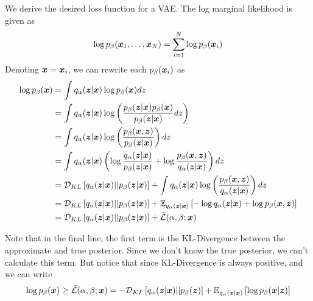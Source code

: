 We derive the desired loss function for a VAE. The log marginal likelihood is given as
\begin{equation}
  \log p_{\beta}(\boldsymbol{x}_1,\ldots,\boldsymbol{x}_N) = \sum_{i=1}^N \log p_{\beta}(\boldsymbol{x}_i)
  \label{eq:vae_marginal}
\end{equation}
Denoting $\boldsymbol{x} = \boldsymbol{x}_i$, we can rewrite each $p_{\beta}(\boldsymbol{x}_i)$ as 
\begin{equation}
  \begin{split}
    \log p_{\beta}(\boldsymbol{x}) &= \int q_\alpha(\boldsymbol{z} |\boldsymbol{x}) \log p_{\beta} (\boldsymbol{x})dz \\
    &= \int q_\alpha(\boldsymbol{z} | \boldsymbol{x}) \log \left( \frac{p_{\beta}(\boldsymbol{z} | \boldsymbol{x}) p_{\beta}(\boldsymbol{x})}{p_{\beta}(\boldsymbol{z} | \boldsymbol{x})} dz \right) \\
    &= \int q_\alpha(\boldsymbol{z} | \boldsymbol{x}) \log \left( \frac{p_{\beta}(\boldsymbol{x}, \boldsymbol{z})}{p_{\beta}(\boldsymbol{z} | \boldsymbol{x})} \right) dz\\
    &= \int q_\alpha(\boldsymbol{z} | \boldsymbol{x}) \left( \log \frac{q_\alpha(\boldsymbol{z} | \boldsymbol{x})}{p_{\beta}(\boldsymbol{z} | \boldsymbol{x})} + \log \frac{p_{\beta}(\boldsymbol{x}, \boldsymbol{z})}{q_\alpha(\boldsymbol{z} | \boldsymbol{x})}\right) dz \\
    &= \mathcal{D}_{KL}\left[ q_\alpha(\boldsymbol{z} |\boldsymbol{x}) || p_{\beta}(\boldsymbol{z} | \boldsymbol{x}) \right] + \int q_\alpha(\boldsymbol{z} | \boldsymbol{x}) \log \left( \frac{p_{\beta}(\boldsymbol{x}, \boldsymbol{z})}{q_\alpha(\boldsymbol{z} | \boldsymbol{x})} \right)dz \\
    &= \mathcal{D}_{KL}\left[ q_\alpha(\boldsymbol{z} |\boldsymbol{x}) || p_{\beta}(\boldsymbol{z} | \boldsymbol{x}) \right] + \mathbb{E}_{q_\alpha(\boldsymbol{z} | \boldsymbol{x})}\left[ -\log q_\alpha(\boldsymbol{z} | \boldsymbol{x}) + \log p_{\beta}(\boldsymbol{x}, \boldsymbol{z}) \right] \\
    &= \mathcal{D}_{KL}\left[ q_\alpha(\boldsymbol{z} |\boldsymbol{x}) || p_{\beta}(\boldsymbol{z} | \boldsymbol{x}) \right] + \tilde{\mathcal{L}}(\alpha, \beta; \boldsymbol{x})
\label{eq:vae_derive}
  \end{split}
\end{equation}

Note that in the final line, the first term is the KL-Divergence between the approximate and true posterior. Since we don't know the true posterior, we can't calculate this term. But notice that since KL-Divergence is always positive, and we can write 
\begin{equation}
  \begin{split}
    \log p_\beta (\boldsymbol{x}) \geq \tilde{\mathcal{L}}(\alpha, \beta; \boldsymbol{x}) = -\mathcal{D}_{KL}\left[ q_\alpha(\boldsymbol{z} | \boldsymbol{x}) || p_{\beta}(\boldsymbol{z}) \right] + \mathbb{E}_{q_\alpha(\boldsymbol{z} | \boldsymbol{x})}\left[ \log p_{\beta}(\boldsymbol{x} | \boldsymbol{z}) \right]
  \label{eq:elbo}
\end{split}
\end{equation}

